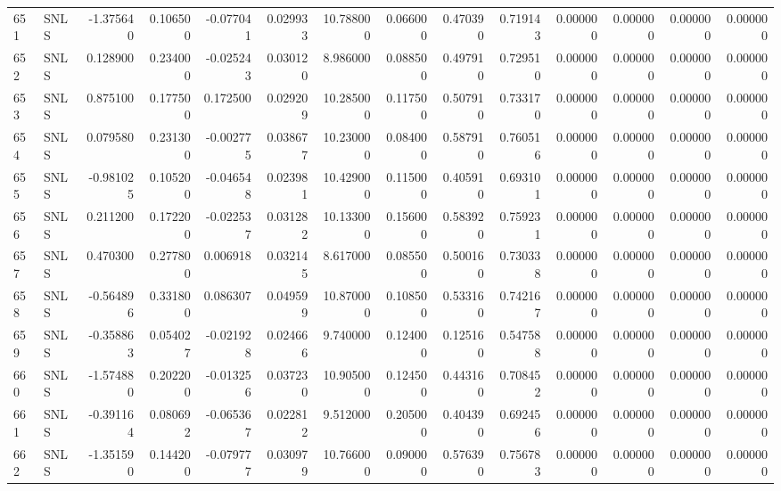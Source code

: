 \begin{tabular}{llrrrrrrrrrrrr}
651 &   SNLS & -1.375640 &      0.106500 & -0.077041 &    0.029933 &  10.788000 &      0.066000 &   0.470390 &  0.719143 &  0.000000 &   0.000000 &     0.000000 &     0.000000 \\
652 &   SNLS &  0.128900 &      0.234000 & -0.025243 &    0.030120 &   8.986000 &      0.088500 &   0.497910 &  0.729510 &  0.000000 &   0.000000 &     0.000000 &     0.000000 \\
653 &   SNLS &  0.875100 &      0.177500 &  0.172500 &    0.029209 &  10.285000 &      0.117500 &   0.507910 &  0.733170 &  0.000000 &   0.000000 &     0.000000 &     0.000000 \\
654 &   SNLS &  0.079580 &      0.231300 & -0.002775 &    0.038677 &  10.230000 &      0.084000 &   0.587910 &  0.760516 &  0.000000 &   0.000000 &     0.000000 &     0.000000 \\
655 &   SNLS & -0.981025 &      0.105200 & -0.046548 &    0.023981 &  10.429000 &      0.115000 &   0.405910 &  0.693101 &  0.000000 &   0.000000 &     0.000000 &     0.000000 \\
656 &   SNLS &  0.211200 &      0.172200 & -0.022537 &    0.031282 &  10.133000 &      0.156000 &   0.583920 &  0.759231 &  0.000000 &   0.000000 &     0.000000 &     0.000000 \\
657 &   SNLS &  0.470300 &      0.277800 &  0.006918 &    0.032145 &   8.617000 &      0.085500 &   0.500160 &  0.730338 &  0.000000 &   0.000000 &     0.000000 &     0.000000 \\
658 &   SNLS & -0.564896 &      0.331800 &  0.086307 &    0.049599 &  10.870000 &      0.108500 &   0.533160 &  0.742167 &  0.000000 &   0.000000 &     0.000000 &     0.000000 \\
659 &   SNLS & -0.358863 &      0.054027 & -0.021928 &    0.024666 &   9.740000 &      0.124000 &   0.125160 &  0.547588 &  0.000000 &   0.000000 &     0.000000 &     0.000000 \\
660 &   SNLS & -1.574880 &      0.202200 & -0.013256 &    0.037230 &  10.905000 &      0.124500 &   0.443160 &  0.708452 &  0.000000 &   0.000000 &     0.000000 &     0.000000 \\
661 &   SNLS & -0.391164 &      0.080692 & -0.065367 &    0.022812 &   9.512000 &      0.205000 &   0.404390 &  0.692456 &  0.000000 &   0.000000 &     0.000000 &     0.000000 \\
662 &   SNLS & -1.351590 &      0.144200 & -0.079777 &    0.030979 &  10.766000 &      0.090000 &   0.576390 &  0.756783 &  0.000000 &   0.000000 &     0.000000 &     0.000000 \\

\end{tabular}
